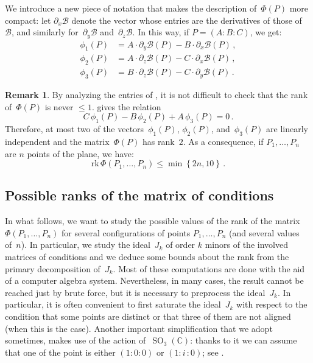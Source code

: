 \documentclass[a4paper, 11pt, reqno]{amsart}
\theoremstyle{plain}
\theoremstyle{definition}
\newtheorem{rmk}[lemma]{Remark}
\newcommand{\C}{\mathbb{C}}
\newcommand{\de}{\partial}
\newcommand{\iii}{\textit{i}\,}
\newcommand{\rk}{\ensuremath{\mathrm{rk}}}
\newcommand{\SO}{\operatorname{SO}}
\begin{document}
We introduce a new piece of notation that makes the description of~$\Phi(P)$ more compact: let $\de_x \mathcal{B}$ denote the vector whose entries are the derivatives of those of~$\mathcal{B}$, and similarly for~$\de_y \mathcal{B}$ and~$\de_z \mathcal{B}$.
In this way, if $P=(A: B: C)$, we get:
%
\begin{equation}
\label{equation:vector_conditions}
  \begin{aligned}
    \phi_1(P) &= A\cdot \de_y \mathcal{B}(P) - B\cdot \de_x \mathcal{B}(P) \,, \\
    \phi_2(P) &= A\cdot \de_z \mathcal{B}(P) - C\cdot \de_x \mathcal{B}(P) \,, \\
    \phi_3(P) &= B\cdot \de_z \mathcal{B}(P) - C\cdot \de_y \mathcal{B}(P) \,.
  \end{aligned}
\end{equation}
%
\begin{rmk}
\label{remark:rank_2}
By analyzing the entries of , it is not difficult to check that the rank of~$\Phi(P)$ is never $\leq 1$.  gives the relation
%
\begin{equation}
\label{eq:syzygy}
  C \, \phi_1(P) - B \, \phi_2(P) + A \, \phi_3(P) = 0 \,.
\end{equation}
%
Therefore, at most two of the vectors~$\phi_1(P)$, $\phi_2(P)$, and~$\phi_3(P)$ are linearly independent and the matrix~$\Phi(P)$ has rank~$2$.
As a consequence, if $P_1, \dots, P_n$ are $n$ points of the plane, we have:
%
\[
  \rk \,\Phi(P_1, \dots, P_n) \leq \min \left\{2n, 10 \right\} \,.
\]
%
\end{rmk}

\subsection{Possible ranks of the matrix of conditions}

In what follows, we want to study the possible values of the rank of the matrix
$\Phi(P_1, \dots, P_n)$ for several configurations of points $P_1, \dots, P_n$
(and several values of~$n$).
In particular, we study the ideal~$J_k$ of order $k$ minors of the
involved matrices of conditions and we deduce some bounds about the rank from the primary
decomposition of~$J_k$. 
Most of these computations are done with the aid of a computer algebra system.
Nevertheless, in many cases, the result cannot be reached just by brute force, 
but it is necessary to preprocess the ideal~$J_k$. 
In particular, it is often convenient to first saturate the ideal~$J_k$ with respect to
the condition that some points are distinct or that three of them are not aligned 
(when this is the case). 
Another important simplification that we adopt sometimes, makes use
of the action of~$\SO_3(\C)$: thanks to it we can assume that one of
the point is either $(1: 0: 0)$ or $(1: \iii: 0)$; see .
\end{document}
